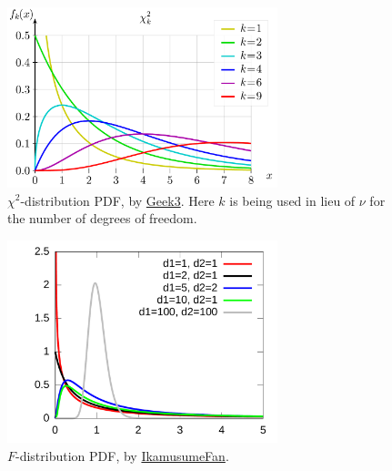\begin{figure}
\centering
\includegraphics[width=0.7\textwidth]{figures/stats/dist/chi2_pdf}
\caption{
$\chi^{2}$-distribution PDF,
by \href{https://en.wikipedia.org/wiki/File:Chi-square_pdf.svg}{Geek3}.
Here $k$ is being used in lieu of $\nu$ for the number of degrees of freedom.
}
\label{fig:dist:chi2}
\end{figure}

\begin{figure}
\centering
\includegraphics[width=0.7\textwidth]{figures/stats/dist/F_pdf}
\caption{
$F$-distribution PDF,
by \href{https://en.wikipedia.org/wiki/File:F-distribution_pdf.svg}{IkamusumeFan}.
}
\label{fig:dist:F}
\end{figure}
